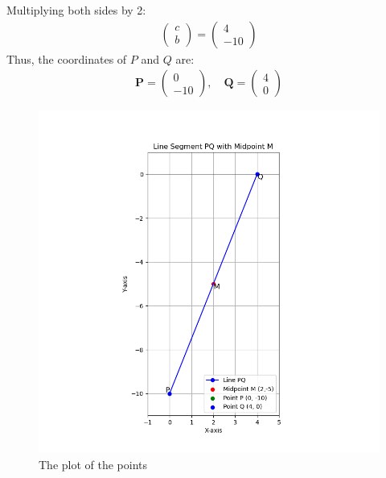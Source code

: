 \documentclass[journal]{IEEEtran}
\numberwithin{equation}{enumi}
\numberwithin{figure}{enumi}
\begin{document}
Multiplying both sides by 2:
\begin{align}
       \begin{pmatrix} c \\ b \end{pmatrix} = \begin{pmatrix} 4 \\ -10 \end{pmatrix}
\end{align}
Thus, the coordinates of $P$ and $Q$ are:
\begin{align}
       \mathbf{P} = \begin{pmatrix} 0 \\ -10 \end{pmatrix}, \quad \mathbf{Q} = \begin{pmatrix} 4 \\ 0 \end{pmatrix}
\end{align}

\begin{figure}[ht!]
  \hspace{-3cm}
  \includegraphics[width=1.5\textwidth]{Figure_1.png}
  
  \caption{The plot of the points }
  \label{fig:your_label}
\end{figure}
\end{document}

